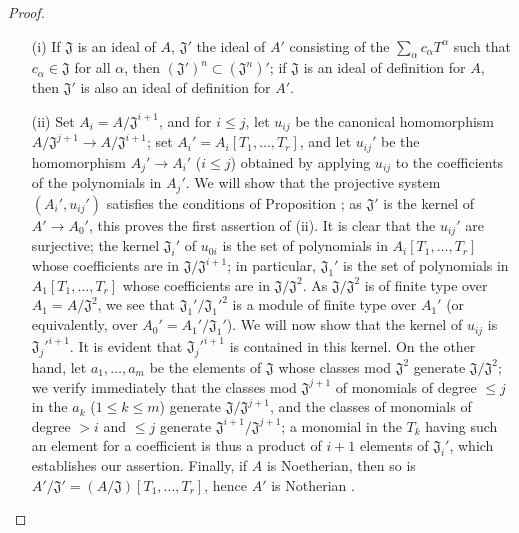\begin{proof}
\medskip\noindent
\begin{enumerate}
  \item[(i)] If $\mathfrak{J}$ is an ideal of $A$, $\mathfrak{J}'$ the ideal of $A'$
    consisting of the $\sum_\alpha c_\alpha T^\alpha$ such that $c_\alpha\in\mathfrak{J}$
    for all $\alpha$, then $(\mathfrak{J}')^n\subset(\mathfrak{J}^n)'$; if $\mathfrak{J}$
    is an ideal of definition for $A$, then $\mathfrak{J}'$ is also an ideal of definition
    for $A'$.
  \item[(ii)] Set $A_i=A/\mathfrak{J}^{i+1}$, and for $i\leq j$, let $u_{ij}$ be the
    canonical homomorphism $A/\mathfrak{J}^{j+1}\to A/\mathfrak{J}^{i+1}$; set
    $A_i'=A_i[T_1,\dots,T_r]$, and let $u_{ij}'$ be the homomorphism $A_j'\to A_i'$
    ($i\leq j$) obtained by applying $u_{ij}$ to the coefficients of the polynomials
    in $A_j'$. We will show that the projective system $(A_i',u_{ij}')$ satisfies the conditions
    of Proposition ; as $\mathfrak{J}'$ is the kernel of
    $A'\to A_0'$, this proves the first assertion of (ii). It is clear that the $u_{ij}'$ are
    surjective; the kernel $\mathfrak{J}_i'$ of $u_{0i}$ is the set of polynomials in
    $A_i[T_1,\dots,T_r]$ whose coefficients are in $\mathfrak{J}/\mathfrak{J}^{i+1}$; in
    particular, $\mathfrak{J}_1'$ is the set of polynomials in $A_1[T_1,\dots,T_r]$ whose
    coefficients are in $\mathfrak{J}/\mathfrak{J}^2$. As $\mathfrak{J}/\mathfrak{J}^2$ is
    of finite type over $A_1=A/\mathfrak{J}^2$, we see that $\mathfrak{J}_1'/{\mathfrak{J}_1'}^2$
    is a module of finite type over $A_1'$ (or equivalently, over $A_0'=A_1'/\mathfrak{J}_1'$).
    We will now show that the kernel of $u_{ij}$ is ${\mathfrak{J}_j'}^{i+1}$. It is evident that
    ${\mathfrak{J}_j'}^{i+1}$ is contained in this kernel. On the other hand, let $a_1,\dots,a_m$
    be the elements of $\mathfrak{J}$ whose classes mod $\mathfrak{J}^2$ generate
    $\mathfrak{J}/\mathfrak{J}^2$; we verify immediately that the classes mod $\mathfrak{J}^{j+1}$
    of monomials of degree $\leq j$ in the $a_k$ ($1\leq k\leq m$) generate
    $\mathfrak{J}/\mathfrak{J}^{j+1}$, and the classes of monomials of degree $>i$ and
    $\leq j$ generate $\mathfrak{J}^{i+1}/\mathfrak{J}^{j+1}$; a monomial in the $T_k$
    having such an element for a coefficient is thus a product of $i+1$ elements of
    $\mathfrak{J}_i'$, which establishes our assertion. Finally, if $A$ is Noetherian, then so
    is $A'/\mathfrak{J}'=(A/\mathfrak{J})[T_1,\dots,T_r]$, hence $A'$ is Notherian .
\end{enumerate}
\end{proof}

